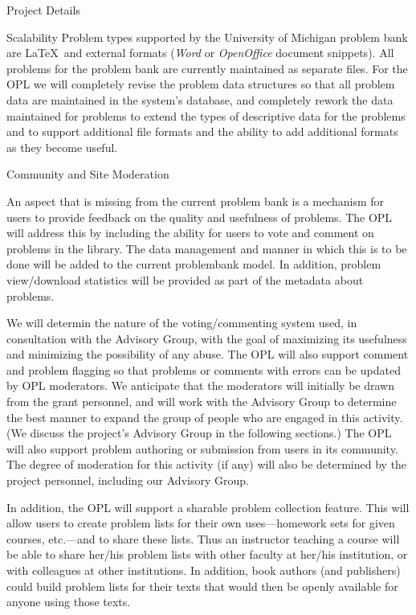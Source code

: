 \documentclass[11pt]{article}
\begin{document}
\begin{section}{Project Details}
\begin{subsection}{Scalability}
Problem types supported by the University of Michigan problem bank are
\LaTeX\ and external formats (\emph{Word} or \emph{OpenOffice} document
snippets). All problems for the problem bank are currently maintained as
separate files. For the OPL we will completely revise the problem data
structures so that all problem data are maintained in the system's
database, and completely rework the data maintained for problems to extend
the types of descriptive data for the problems and to support additional
file formats and the ability to add additional formats as they become
useful.

\end{subsection}

\begin{subsection}{Community and Site Moderation}

An aspect that is missing from the current problem bank is a mechanism for
users to provide feedback on the quality and usefulness of problems. The
OPL will address this by including the ability for users to vote and
comment on problems in the library.  The data management and manner in
which this is to be done will be added to the current problembank
model.  In addition, problem view/download statistics will be provided as
part of the metadata about problems.

We will determin the nature of the voting/commenting system used, in
consultation with the Advisory Group, with the goal of maximizing its
usefulness and minimizing the possibility of any abuse. The OPL will also
support comment and problem flagging so that problems or comments with
errors can be updated by OPL moderators. We anticipate that the moderators
will initially be drawn from the grant personnel, and will work with the
Advisory Group to determine the best manner to expand the group of people
who are engaged in this activity.  (We discuss the project's Advisory
Group in the following sections.)  The OPL will also support problem
authoring or submission from users in its community.  The degree of
moderation for this activity (if any) will also be determined by the
project personnel, including our Advisory Group.

In addition, the OPL will support a sharable problem collection feature.
This will allow users to create problem lists for their own
uses---homework sets for given courses, etc.---and to share these lists.
Thus an instructor teaching a course will be able to share her/his problem
lists with other faculty at her/his institution, or with colleagues at
other institutions.  In addition, book authors (and publishers) could
build problem lists for their texts that would then be openly available
for anyone using those texts.


\end{subsection}
\end{section}
\end{document}
